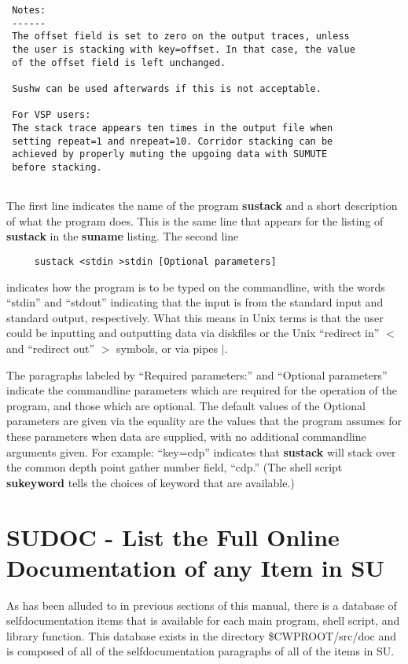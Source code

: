 {{{\begin{verbatim}
 Notes:                                                 
 ------                                                 
 The offset field is set to zero on the output traces, unless   
 the user is stacking with key=offset. In that case, the value 
 of the offset field is left unchanged.                         
                                                                
 Sushw can be used afterwards if this is not acceptable.        
                                                                
 For VSP users:                                         
 The stack trace appears ten times in the output file when      
 setting repeat=1 and nrepeat=10. Corridor stacking can be      
 achieved by properly muting the upgoing data with SUMUTE       
 before stacking.     
                                                                
\end{verbatim}}\noindent

The first line indicates the name of the program {\bf sustack\/} and
a short description of what the program does. 
This is the same line that appears for the listing of  {\bf sustack\/}
in the {\bf suname\/} listing.
The second line
\begin{verbatim}
     sustack <stdin >stdin [Optional parameters]
\end{verbatim}\noindent
indicates how the program is to be typed on the commandline, with
the words ``stdin'' and ``stdout'' indicating that the input
is from the standard input and standard output, respectively.
What this means in Unix terms is that the user could be inputting
and outputting data via diskfiles or the Unix ``redirect in'' $<$ 
and ``redirect out'' $>$ symbols, or via pipes $|$.

The paragraphs labeled by ``Required parameters:'' and ``Optional parameters''
indicate the commandline parameters which are required for the operation
of the program, and those which are optional. The default values of
the Optional parameters are given via the equality  are the values that the program assumes
for these parameters when data are supplied,  with no additional commandline
arguments given. For example: ``key=cdp'' indicates that {\bf sustack\/} will
stack over the common depth point gather number field, ``cdp.''
(The shell script {\bf sukeyword\/} tells the choices of keyword that
are available.) 

\section{SUDOC - List the Full Online Documentation of any Item in SU}
As has been alluded to in previous sections of this manual, there
is a database of selfdocumentation items that is available for each
main program, shell script, and library function.
This database exists in the directory \$CWPROOT/src/doc  and is
composed of all of the selfdocumentation paragraphs of all of the
items in SU.

}}
